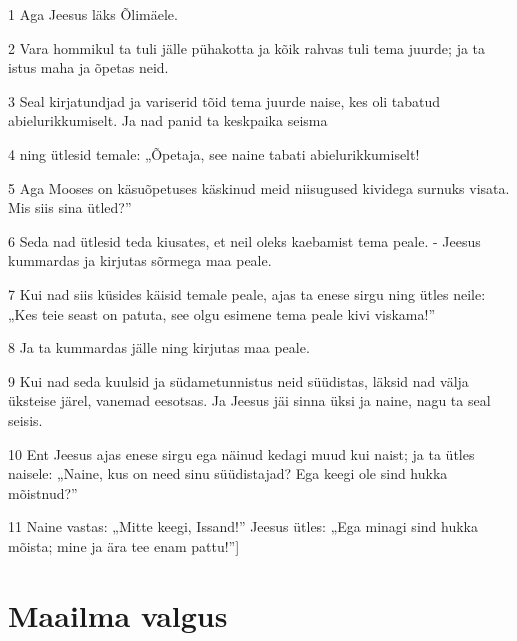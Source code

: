 \par 1 Aga Jeesus läks Õlimäele.
\par 2 Vara hommikul ta tuli jälle pühakotta ja kõik rahvas tuli tema juurde; ja ta istus maha ja õpetas neid.
\par 3 Seal kirjatundjad ja variserid tõid tema juurde naise, kes oli tabatud abielurikkumiselt. Ja nad panid ta keskpaika seisma
\par 4 ning ütlesid temale: „Õpetaja, see naine tabati abielurikkumiselt!
\par 5 Aga Mooses on käsuõpetuses käskinud meid niisugused kividega surnuks visata. Mis siis sina ütled?”
\par 6 Seda nad ütlesid teda kiusates, et neil oleks kaebamist tema peale. - Jeesus kummardas ja kirjutas sõrmega maa peale.
\par 7 Kui nad siis küsides käisid temale peale, ajas ta enese sirgu ning ütles neile: „Kes teie seast on patuta, see olgu esimene tema peale kivi viskama!”
\par 8 Ja ta kummardas jälle ning kirjutas maa peale.
\par 9 Kui nad seda kuulsid ja südametunnistus neid süüdistas, läksid nad välja üksteise järel, vanemad eesotsas. Ja Jeesus jäi sinna üksi ja naine, nagu ta seal seisis.
\par 10 Ent Jeesus ajas enese sirgu ega näinud kedagi muud kui naist; ja ta ütles naisele: „Naine, kus on need sinu süüdistajad? Ega keegi ole sind hukka mõistnud?”
\par 11 Naine vastas: „Mitte keegi, Issand!” Jeesus ütles: „Ega minagi sind hukka mõista; mine ja ära tee enam pattu!”]

\section*{Maailma valgus}

